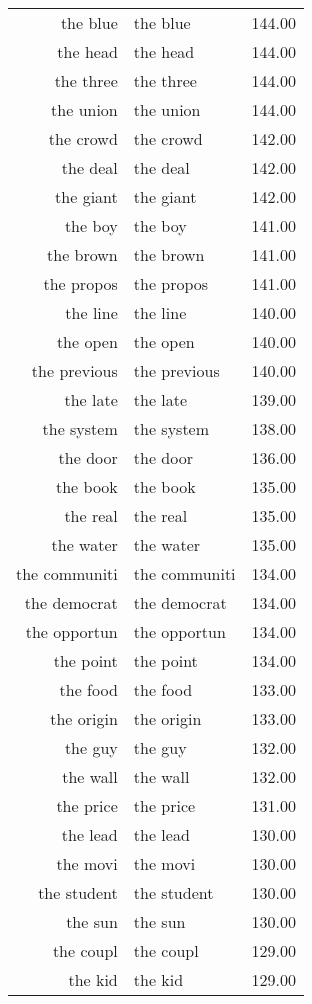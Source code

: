 \begin{table}[ht]
\begin{tabular}{rlr}
  the blue & the blue & 144.00 \\ 
  the head & the head & 144.00 \\ 
  the three & the three & 144.00 \\ 
  the union & the union & 144.00 \\ 
  the crowd & the crowd & 142.00 \\ 
  the deal & the deal & 142.00 \\ 
  the giant & the giant & 142.00 \\ 
  the boy & the boy & 141.00 \\ 
  the brown & the brown & 141.00 \\ 
  the propos & the propos & 141.00 \\ 
  the line & the line & 140.00 \\ 
  the open & the open & 140.00 \\ 
  the previous & the previous & 140.00 \\ 
  the late & the late & 139.00 \\ 
  the system & the system & 138.00 \\ 
  the door & the door & 136.00 \\ 
  the book & the book & 135.00 \\ 
  the real & the real & 135.00 \\ 
  the water & the water & 135.00 \\ 
  the communiti & the communiti & 134.00 \\ 
  the democrat & the democrat & 134.00 \\ 
  the opportun & the opportun & 134.00 \\ 
  the point & the point & 134.00 \\ 
  the food & the food & 133.00 \\ 
  the origin & the origin & 133.00 \\ 
  the guy & the guy & 132.00 \\ 
  the wall & the wall & 132.00 \\ 
  the price & the price & 131.00 \\ 
  the lead & the lead & 130.00 \\ 
  the movi & the movi & 130.00 \\ 
  the student & the student & 130.00 \\ 
  the sun & the sun & 130.00 \\ 
  the coupl & the coupl & 129.00 \\ 
  the kid & the kid & 129.00 \\ 

\end{tabular}
\end{table}

